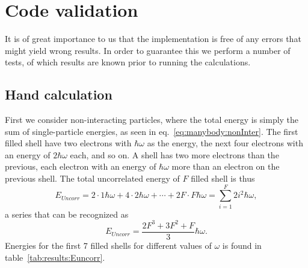 \section{Code validation}
It is of great importance to us that the implementation is free of any errors that might yield wrong results.
In order to guarantee this we perform a number of tests, of which results are known prior to running the calculations.

\subsection{Hand calculation}
First we consider non-interacting particles, where the total energy is simply the sum of single-particle energies, as seen in eq.~\eqref{eq:manybody:nonInter}.
The first filled shell have two electrons with $\hbar \omega$ as the energy, the next four electrons with an energy of $2\hbar \omega$ each, and so on.
A shell has two more electrons than the previous, each electron with an energy of $\hbar \omega$ more than an electron on the previous shell.
The total uncorrelated energy of $F$ filled shell is thus
\begin{equation}
E_{Uncorr} = 
2 \cdot 1\hbar \omega 
+ 
4 \cdot 2\hbar \omega 
+
\cdots
+
2F \cdot F\hbar \omega
=
\sum_{i=1}^F 2 i^2 \hbar\omega , 
\end{equation}
a series that can be recognized as 
\begin{equation}
E_{Uncorr} = \frac{2F^3 + 3F^2 + F}{3} \hbar \omega .
\end{equation}
Energies for the first 7 filled shells for different values of $\omega$ is found in table~\ref{tab:results:Euncorr}.
